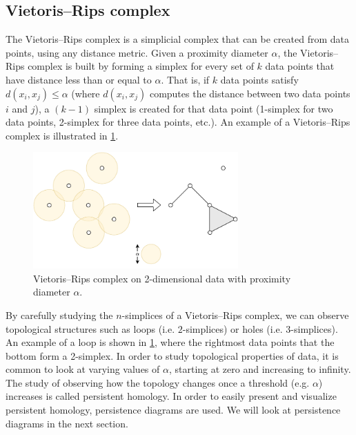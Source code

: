 \subsection{Vietoris–Rips complex}
The Vietoris–Rips complex is a simplicial complex that can be created from data points, using any distance metric. Given a proximity diameter $\alpha$, the Vietoris–Rips complex is built by forming a simplex for every set of $k$ data points that have distance less than or equal to $\alpha$. That is, if $k$ data points satisfy $d(x_i, x_j) \leq \alpha$ (where $d(x_i, x_j)$ computes the distance between two data points $i$ and $j$), a $(k-1)$ simplex is created for that data point (1-simplex for two data points, 2-simplex for three data points, etc.). An example of a Vietoris–Rips complex is illustrated in \cref{fig:simplicial-complex-rips}.
\begin{figure}[H]
    \centering
    \includegraphics[width=0.7\textwidth]{thesis/figures/simplicial-complex-rips_cropped.pdf}
    \caption{Vietoris–Rips complex on 2-dimensional data with proximity diameter $\alpha$.}
    \label{fig:simplicial-complex-rips}
\end{figure}
By carefully studying the $n$-simplices of a Vietoris–Rips complex, we can observe topological structures such as loops (i.e. $2$-simplices) or holes  (i.e. $3$-simplices). An example of a loop is shown in \cref{fig:simplicial-complex-rips}, where the rightmost data points that the bottom form a 2-simplex. In order to study topological properties of data, it is common to look at varying values of $\alpha$, starting at zero and increasing to infinity. The study of observing how the topology changes once a threshold (e.g. $\alpha$) increases is called persistent homology. In order to easily present and visualize persistent homology, persistence diagrams are used. We will look at persistence diagrams in the next section.

